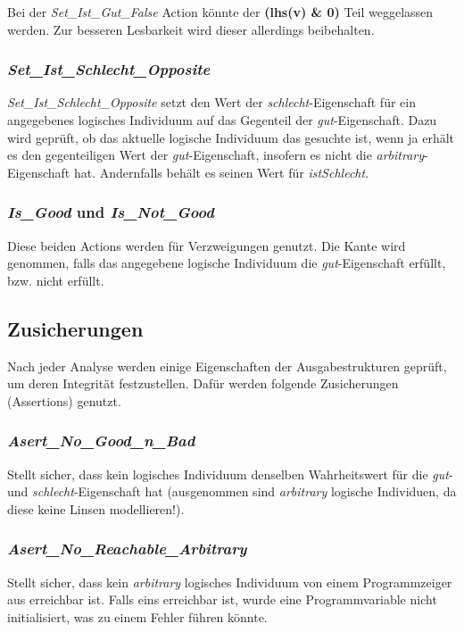 Bei der \emph{Set\_Ist\_Gut\_False} Action könnte der \textbf{(lhs(v) \& 0)} Teil weggelassen werden. Zur besseren Lesbarkeit wird dieser allerdings beibehalten.




\subsubsection{\emph{Set\_Ist\_Schlecht\_Opposite}}

\emph{Set\_Ist\_Schlecht\_Opposite} setzt den Wert der \emph{schlecht}-Eigenschaft für ein angegebenes logisches Individuum auf das Gegenteil der \emph{gut}-Eigenschaft. Dazu wird geprüft, ob das aktuelle logische Individuum das gesuchte ist, wenn ja erhält es den gegenteiligen Wert der \emph{gut}-Eigenschaft, insofern es nicht die \emph{arbitrary}-Eigenschaft hat. Andernfalls behält es seinen Wert für \emph{istSchlecht}.



\subsubsection{\emph{Is\_Good} und \emph{Is\_Not\_Good}}
Diese beiden Actions werden für Verzweigungen genutzt. Die Kante wird genommen, falls das angegebene logische Individuum die \emph{gut}-Eigenschaft erfüllt, bzw. nicht erfüllt.


\subsection{Zusicherungen}
Nach jeder Analyse werden einige Eigenschaften der Ausgabestrukturen geprüft, um deren Integrität festzustellen. Dafür werden folgende Zusicherungen (Assertions) genutzt.

\subsubsection{\emph{Asert\_No\_Good\_n\_Bad}}
Stellt sicher, dass kein logisches Individuum denselben Wahrheitswert für die \emph{gut}- und \emph{schlecht}-Eigenschaft hat (ausgenommen sind \emph{arbitrary} logische Individuen, da diese keine Linsen modellieren!).


\subsubsection{\emph{Asert\_No\_Reachable\_Arbitrary}}
Stellt sicher, dass kein \emph{arbitrary} logisches Individuum von einem Programmzeiger aus erreichbar ist. Falls eins erreichbar ist, wurde eine Programmvariable nicht initialisiert, was zu einem Fehler führen könnte.

